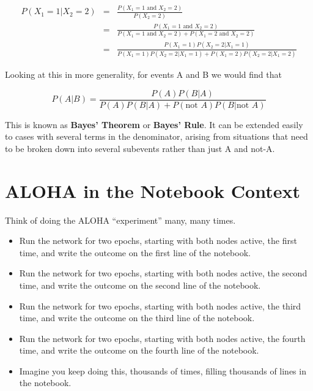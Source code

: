 \begin{eqnarray}
P(X_1 = 1 | X_2 = 2) &=& 
\frac
{P(X_1 = 1 \textrm{ and } X_2 = 2)}
{P(X_2 = 2)} \\
&=& \frac
{P(X_1 = 1 \textrm{ and } X_2 = 2)}
{P(X_1 = 1 \textrm{ and } X_2 = 2) + P(X_1 = 2 \textrm{ and } X_2 = 2)} \\
&=& \frac
{P(X_1 = 1) P(X_2 = 2 | X_1 = 1)}
{P(X_1 = 1) P(X_2 = 2 | X_1 = 1) + P(X_1 = 2) P(X_2 = 2 | X_1 = 2)} 
\end{eqnarray}

Looking at this in more generality, for events A and B we would find
that

\begin{equation}
\label{thisisbayes}
P(A|B) = \frac{P(A) P(B|A)}{P(A) P(B|A) + P(\textrm{not }A)
P(B|\textrm{not } A)}
\end{equation}

This is known as {\bf Bayes' Theorem} or {\bf Bayes' Rule}.  It can be
extended easily to cases with several terms in the denominator, arising
from situations that need to be broken down into several subevents
rather than just A and not-A.

\section{ALOHA in the Notebook Context}

Think of doing the ALOHA ``experiment'' many, many times.

\begin{itemize}

\item Run the network for two epochs, starting with both nodes active,
the first time, and write the outcome on the first
line of the notebook.

\item Run the network for two epochs, starting with both nodes active,
the second time, and write the outcome on the second line of the
notebook.

\item Run the network for two epochs, starting with both nodes active,
the third time, and write the outcome on the third line of the notebook.

\item Run the network for two epochs, starting with both nodes active,
the fourth time, and write the outcome on the fourth line of the
notebook.

\item Imagine you keep doing this, thousands of times, filling
thousands of lines in the notebook.

\end{itemize} 

